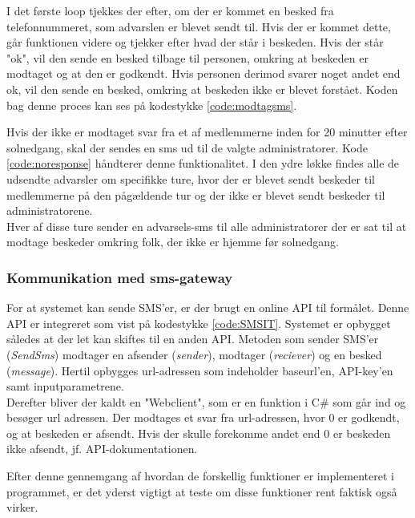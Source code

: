 I det første loop tjekkes der efter, om der er kommet en besked fra telefonnummeret, som advarslen er blevet sendt til. Hvis der er kommet dette, går funktionen videre og tjekker efter hvad der står i beskeden. Hvis der står "ok", vil den sende en besked tilbage til personen, omkring at beskeden er modtaget og at den er godkendt. Hvis personen derimod svarer noget andet end ok, vil den sende en besked, omkring at beskeden ikke er blevet forstået. Koden bag denne proces kan ses på kodestykke \ref{code:modtagsms}.

Hvis der ikke er modtaget svar fra et af medlemmerne inden for 20 minutter efter solnedgang, skal der sendes en sms ud til de valgte administratorer. Kode \ref{code:noresponse} håndterer denne funktionalitet. I den ydre løkke findes alle de udsendte advarsler om specifikke ture, hvor der er blevet sendt beskeder til medlemmerne på den pågældende tur og der ikke er blevet sendt beskeder til administratorene.\\

Hver af disse ture sender en advarsels-sms til alle administratorer der er sat til at modtage beskeder omkring folk, der ikke er hjemme før solnedgang.


\subsubsection{Kommunikation med sms-gateway}
For at systemet kan sende SMS'er, er der brugt en online API til formålet. Denne API er integreret som vist på kodestykke \ref{code:SMSIT}.
Systemet er opbygget således at der let kan skiftes til en anden API. Metoden som sender SMS'er (\textit{SendSms}) modtager en afsender (\textit{sender}), modtager (\textit{reciever}) og en besked (\textit{message}). Hertil opbygges url-adressen som indeholder baseurl'en, API-key'en samt inputparametrene.\\

Derefter bliver der kaldt en "Webclient", som er en funktion i C\# som går ind og besøger url adressen. Der modtages et svar fra url-adressen, hvor 0 er godkendt, og at beskeden er afsendt. Hvis der skulle forekomme andet end 0 er beskeden ikke afsendt, jf. API-dokumentationen.


Efter denne gennemgang af hvordan de forskellig funktioner er implementeret i programmet, er det yderst vigtigt at teste om disse funktioner rent faktisk også virker.